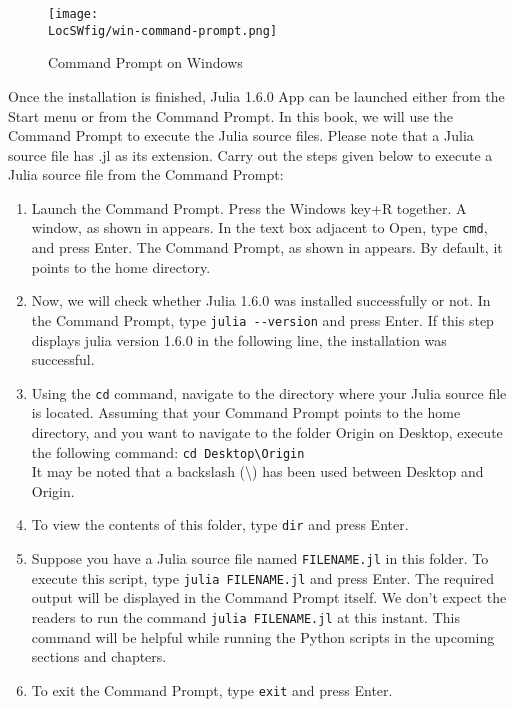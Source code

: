 \begin{figure}
      \centering
      \texttt{[image: \\LocSWfig/win-command-prompt.png]}
      \caption{Command Prompt on Windows}
      \label{windows-cmd-julia}
\end{figure}
Once the installation is finished, Julia 1.6.0 App can be launched either
from the Start menu or from the Command Prompt. In this book, we will use the Command
Prompt to execute the Julia source files. Please note that a Julia source file has .jl as its extension.
Carry out the steps given below to execute a Julia source file from the Command Prompt:
\begin{enumerate}
      \item Launch the Command Prompt. Press the Windows key+R together. A window, as shown in 
            appears. In the text box adjacent to Open, type {\tt cmd}, and press Enter. The Command Prompt, as shown in
             appears. By default, it points to the home directory.
      \item Now, we will check whether Julia 1.6.0 was installed successfully or not.
            In the Command Prompt, type {\tt julia -{}-version} and press Enter.
            If this step displays julia version 1.6.0 in the following line, the installation was successful.
      \item Using the {\tt cd} command, navigate to the directory where your Julia source file is located.
            Assuming that your Command Prompt points to the
            home directory, and you want to navigate to the folder Origin on
            Desktop, execute the following command: {\tt cd Desktop\textbackslash Origin} \\
            It may be noted that a backslash (\textbackslash) has been used between
            Desktop and Origin.
      \item To view the contents of this folder, type {\tt dir} and press Enter.
      \item Suppose you have a Julia source file named {\tt FILENAME.jl} in this
            folder. To execute this script, type {\tt julia FILENAME.jl} and press
            Enter. The required output will be displayed in the Command Prompt itself.
            We don't expect the readers to run the command {\tt julia FILENAME.jl} at
            this instant. This command will be helpful while running the Python
            scripts in the upcoming sections and chapters.
      \item To exit the Command Prompt, type {\tt exit} and press Enter.
\end{enumerate}

